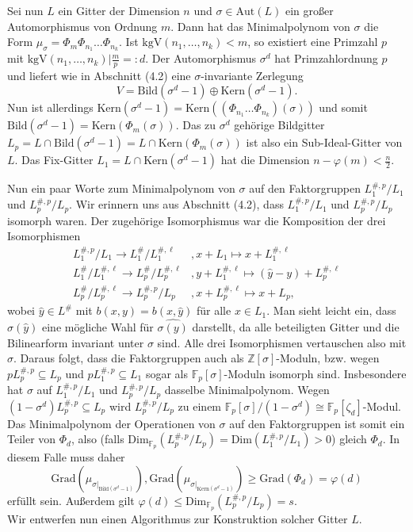 \documentclass[12pt,a4paper,halfparskip,headsepline,bibtotocnumbered]{scrreprt}
\theoremstyle{nummermitklammern}
\theoremstyle{nonumberbreak}
\newcommand{\Z}{\mathbb{Z}}
\newcommand{\F}{\mathbb{F}}
\newcommand{\Kern}{\text{Kern}}
\newcommand{\Bild}{\text{Bild}}
\newcommand{\kgV}{\text{kgV}}
\newcommand{\Aut}{\text{Aut}}
\newcommand{\Dim}{\text{Dim}}
\begin{document}
Sei nun $L$ ein Gitter der Dimension $n$ und $\sigma \in \Aut(L)$ ein großer Automorphismus von Ordnung $m$. Dann hat das Minimalpolynom von $\sigma$ die Form $\mu_\sigma = \Phi_m \Phi_{n_1} \dots \Phi_{n_k}$. Ist $\kgV(n_1, \dots, n_k) < m$, so existiert eine Primzahl $p$ mit $\kgV(n_1, \dots, n_k) \vert \frac{m}{p} =: d$. Der Automorphismus $\sigma^d$ hat Primzahlordnung $p$ und liefert wie in Abschnitt (4.2) eine $\sigma$-invariante Zerlegung 
\begin{equation*}
	V = \Bild(\sigma^d-1) \oplus \Kern(\sigma^d-1).
\end{equation*}
Nun ist allerdings $\Kern(\sigma^d-1) = \Kern\left((\Phi_{n_1} \dots \Phi_{n_k})(\sigma)\right)$ und somit $\Bild(\sigma^d-1) = \Kern(\Phi_m(\sigma))$. Das zu $\sigma^d$ gehörige Bildgitter $L_p = L \cap \Bild(\sigma^d-1) = L \cap \Kern(\Phi_m(\sigma))$ ist also ein Sub-Ideal-Gitter von $L$. Das Fix-Gitter $L_1 = L \cap \Kern(\sigma^d-1)$ hat die Dimension $n-\varphi(m) < \frac{n}{2}$.\par
Nun ein paar Worte zum Minimalpolynom von $\sigma$ auf den Faktorgruppen $L_1^{\#,p}/L_1$ und $L_p^{\#,p} / L_p$. Wir erinnern uns aus Abschnitt (4.2), dass $L_1^{\#,p}/L_1$ und $L_p^{\#,p} / L_p$ isomorph waren. Der zugehörige Isomorphismus war die Komposition der drei Isomorphismen
\begin{align*}
	L_1^{\#,p} / L_1 \rightarrow L_1^\# / L_1^{\#, \ell}&, x + L_1 \mapsto x + L_1^{\#, \ell}\\
	L_1^\#/L_1^{\#,\ell} \rightarrow L_p^\# / L_p^{\#,\ell}&, y + L_1^{\#, \ell} \mapsto (\hat{y} - y) + L_p^{\#, \ell}\\
	L_p^\# / L_p^{\#, \ell} \rightarrow L_p^{\#,p} / L_p&, x + L_p^{\#, \ell} \mapsto x + L_p,
\end{align*}
wobei $\hat{y} \in L^\#$ mit $b(x,y) = b(x,\hat{y})$ für alle $x \in L_1$. Man sieht leicht ein, dass $\sigma(\hat{y})$ eine mögliche Wahl für $\widehat{\sigma(y)}$ darstellt, da alle beteiligten Gitter und die Bilinearform invariant unter $\sigma$ sind. Alle drei Isomorphismen vertauschen also mit $\sigma$. Daraus folgt, dass die Faktorgruppen auch als $\Z[\sigma]$-Moduln, bzw. wegen $p L_p^{\#,p} \subseteq L_p$ und $p L_1^{\#,p} \subseteq L_1$ sogar als $\F_p[\sigma]$-Moduln isomorph sind. Insbesondere hat $\sigma$ auf $L_1^{\#,p}/L_1$ und $L_p^{\#,p}/L_p$ dasselbe Minimalpolynom. Wegen $(1-\sigma^d) L_p^{\#,p} \subseteq L_p$ wird $L_p^{\#,p}/L_p$ zu einem $\F_p[\sigma] / (1-\sigma^d) \cong \F_p[\zeta_d]$-Modul. Das Minimalpolynom der Operationen von $\sigma$ auf den Faktorgruppen ist somit ein Teiler von $\Phi_d$, also (falls $\Dim_{\F_p}(L_p^{\#,p}/L_p) = \Dim(L_1^{\#,p}/L_1) > 0$) gleich $\Phi_d$. In diesem Falle muss daher
\[\text{Grad}(\mu_{\sigma\vert_{\Bild(\sigma^d-1)}}), \text{Grad}(\mu_{\sigma \vert_{\Kern(\sigma^d-1)}}) \geq \text{Grad}(\Phi_d) = \varphi(d)\]
erfüllt sein. Außerdem gilt $\varphi(d) \leq \text{Dim}_{\F_p}(L_p^{\#,p} / L_p) = s$.\\
Wir entwerfen nun einen Algorithmus zur Konstruktion solcher Gitter $L$.
\end{document}

